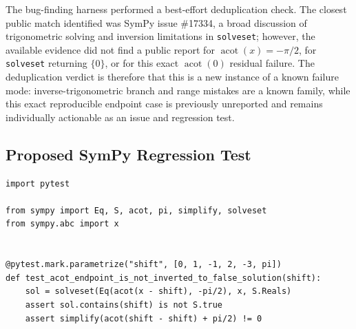 \documentclass[11pt]{article}
\begin{document}
The bug-finding harness performed a best-effort deduplication check. The closest public match identified was SymPy issue \#17334, a broad discussion of trigonometric solving and inversion limitations in \texttt{solveset}; however, the available evidence did not find a public report for \(\operatorname{acot}(x)=-\pi/2\), for \texttt{solveset} returning \(\{0\}\), or for this exact \(\operatorname{acot}(0)\) residual failure. The deduplication verdict is therefore that this is a new instance of a known failure mode: inverse-trigonometric branch and range mistakes are a known family, while this exact reproducible endpoint case is previously unreported and remains individually actionable as an issue and regression test.

\subsection{Proposed SymPy Regression Test}

\medskip

\begin{lstlisting}[style=bugpython]
import pytest

from sympy import Eq, S, acot, pi, simplify, solveset
from sympy.abc import x


@pytest.mark.parametrize("shift", [0, 1, -1, 2, -3, pi])
def test_acot_endpoint_is_not_inverted_to_false_solution(shift):
    sol = solveset(Eq(acot(x - shift), -pi/2), x, S.Reals)
    assert sol.contains(shift) is not S.true
    assert simplify(acot(shift - shift) + pi/2) != 0
\end{lstlisting}
\end{document}
